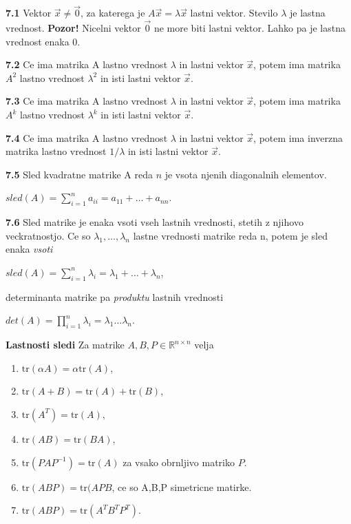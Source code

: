 \documentclass{article}
\begin{document}
\begin{multicols}{2}
\textbf{7.1} Vektor $\vec{x} \neq \vec{0}$, za katerega je $A\vec{x} = \lambda \vec{x}$ lastni vektor. Stevilo
$\lambda$ je lastna vrednost.
\textbf{Pozor!} Nicelni vektor $\vec{0}$ ne more biti lastni vektor. Lahko pa je lastna vrednost enaka 0.

\textbf{7.2} Ce ima matrika A lastno vrednost $\lambda$ in lastni vektor $\vec{x}$, potem ima matrika
$A^{2}$ lastno vrednost $\lambda^{2}$ in isti lastni vektor $\vec{x}$.

\textbf{7.3} Ce ima matrika A lastno vrednost $\lambda$ in lastni vektor $\vec{x}$, potem ima
matrika $A^{k}$ lastno vrednost $\lambda^{k}$ in isti lastni vektor $\vec{x}$.

\textbf{7.4} Ce ima matrika A lastno vrednost $\lambda$ in lastni vektor $\vec{x}$, potem ima
inverzna matrika lastno vrednost $1 / \lambda$ in isti lastni vektor $\vec{x}$.

\textbf{7.5} Sled kvadratne matrike A reda $n$ je vsota njenih diagonalnih elementov.
\begin{center}
    \begin{math}
        sled(A) =
        \sum_{i=1}^{n} a_{ii} =
        a_{11} + \dots + a_{nn}
    \end{math}.
\end{center}

\textbf{7.6} Sled matrike je enaka vsoti vseh lastnih vrednosti, stetih z njihovo veckratnostjo.
Ce so $\lambda_{1}, \dots, \lambda_{n}$ lastne vrednosti matrike reda n, potem je sled enaka \textit{vsoti}
\begin{center}
    \begin{math}
        sled(A) =
        \sum_{i=1}^{n} \lambda_{i} =
        \lambda_{1} + \dots + \lambda_{n}
    \end{math},
\end{center}
determinanta matrike pa \textit{produktu} lastnih vrednosti
\begin{center}
    \begin{math}
        det(A) =
        \prod_{i=1}^{n} \lambda_{i} =
        \lambda_{1} \dots  \lambda_{n}
    \end{math}.
\end{center}

\textbf{Lastnosti sledi} Za matrike \( A, B, P \in \mathbb{R}^{n \times n} \) velja
\begin{enumerate}
    \item \( \text{tr}(\alpha A) = \alpha \text{tr}(A) \),
    \item \( \text{tr}(A + B) = \text{tr}(A) + \text{tr}(B) \),
    \item \( \text{tr}(A^T) = \text{tr}(A) \),
    \item \( \text{tr}(AB) = \text{tr}(BA) \),
    \item \( \text{tr}(PAP^{-1}) = \text{tr}(A) \) za vsako obrnljivo matriko \( P \).
    \item \( \text{tr}(ABP) = \text{tr}(APB\), ce so A,B,P simetricne matirke. 
    \item \( \text{tr}(ABP) = \text{tr}(A^TB^TP^T)\).
\end{enumerate}


\end{multicols}
\end{document}
